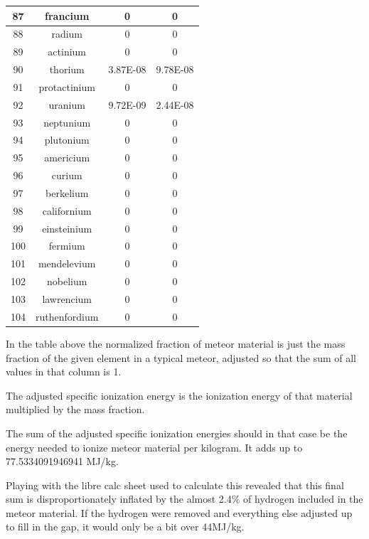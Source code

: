 \documentclass[a4paper]{article}
\begin{document}
\begin{center}
\begin{tabular}{|c|c|c|c|}
			\hline
			87 & francium & 0 & 0 \\
			\hline
			88 & radium & 0 & 0 \\
			\hline
			89 & actinium & 0 & 0 \\
			\hline
			90 & thorium & 3.87E-08 & 9.78E-08 \\
			\hline
			91 & protactinium & 0 & 0 \\
			\hline
			92 & uranium & 9.72E-09 & 2.44E-08 \\
			\hline
			93 & neptunium & 0 & 0 \\
			\hline
			94 & plutonium & 0 & 0 \\
			\hline
			95 & americium & 0 & 0 \\
			\hline
			96 & curium & 0 & 0 \\
			\hline
			97 & berkelium & 0 & 0 \\
			\hline
			98 & californium & 0 & 0 \\
			\hline
			99 & einsteinium & 0 & 0 \\
			\hline
			100 & fermium & 0 & 0 \\
			\hline
			101 & mendelevium & 0 & 0 \\
			\hline
			102 & nobelium & 0 & 0 \\
			\hline
			103 & lawrencium & 0 & 0 \\
			\hline
			104 & ruthenfordium & 0 & 0 \\
			\hline
		\end{tabular}
	\end{center}
	
	\normalsize
	
	In the table above the normalized fraction of meteor material is just the mass fraction of the given element in a typical meteor, adjusted so that the sum of all values in that column is 1.
	
	\medskip
	
	The adjusted specific ionization energy is the ionization energy of that material multiplied by the mass fraction.
	
	\medskip
	
	The sum of the adjusted specific ionization energies should in that case be the energy needed to ionize meteor material per kilogram.
	It adds up to 77.5334091946941 MJ/kg.
	
	\medskip
	
	Playing with the libre calc sheet used to calculate this revealed that this final sum is disproportionately inflated by the almost 2.4\% of hydrogen included in the meteor material.
	If the hydrogen were removed and everything else adjusted up to fill in the gap, it would only be a bit over 44MJ/kg.
	
\end{document}
